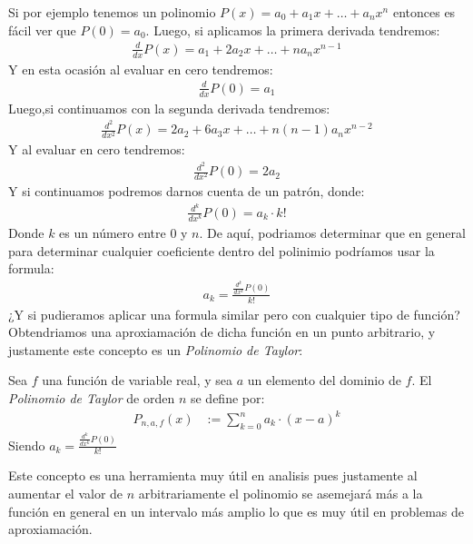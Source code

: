 \documentclass[12pt,a4paper,oneside]{memoir}
\begin{document}
Si por ejemplo tenemos un polinomio $P(x) = a_0 + a_1x + \dots + a_nx^n$ entonces es fácil ver que $P(0) = a_0$. Luego, si aplicamos la primera derivada tendremos:
\begin{align*}
    \frac{d}{dx} P(x) = a_1 + 2a_2x+ \dots + na_nx^{n-1}
\end{align*}
Y en esta ocasión al evaluar en cero tendremos:
\begin{align*}
    \frac{d}{dx} P(0) = a_1
\end{align*}
Luego,si continuamos con la segunda derivada tendremos:
\begin{align*}
    \frac{d^2}{dx^2} P(x) = 2a_2 + 6a_3x + \dots + n(n-1) a_n x^{n-2}
\end{align*}
Y al evaluar en cero tendremos:
\begin{align*}
    \frac{d^2}{dx^2} P(0) = 2a_2
\end{align*}
Y si continuamos podremos darnos cuenta de un patrón, donde:
\begin{align*}
    \frac{d^k}{dx^k} P(0) = a_k \cdot k!
\end{align*}
Donde $k$ es un número entre $0$ y $n$. De aquí, podriamos determinar que en general para determinar cualquier coeficiente dentro del polinimio podríamos usar la formula:
\begin{align*}
    a_k = \frac{\frac{d^k}{dx^k} P(0)}{k!}
\end{align*}
¿Y si pudieramos aplicar una formula similar pero con cualquier tipo de función? Obtendriamos una aproxiamación de dicha función en un punto arbitrario, y justamente este concepto es un \textit{Polinomio de Taylor}:
\begin{definition}
    Sea $f$ una función de variable real, y sea $a$ un elemento del dominio de $f$. El \textit{Polinomio de Taylor} de orden $n$ se define por:
    \begin{align*}
        P_{n, a, f}(x) &:= \sum_{k=0}^n a_k \cdot (x-a)^k
    \end{align*}
    Siendo $a_k = \frac{\frac{d^k}{dx^k} P(0)}{k!}$
\end{definition}
Este concepto es una herramienta muy útil en analisis pues justamente al aumentar el valor de $n$ arbitrariamente el polinomio se asemejará más a la función en general en un intervalo más amplio lo que es muy útil en problemas de aproxiamación.
\end{document}
